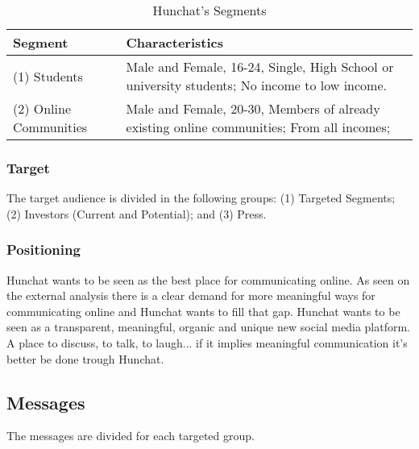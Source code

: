 \documentclass[12pt]{article}
\begin{document}
\begin{table}[htb]
\small
\caption{Hunchat's Segments}
\label{table:seg}
\centering
\begin{tabular}{ @{}P{0.2\textwidth}P{0.7\textwidth}@{} }
Segment	&	Characteristics	\\ \hline
(1) Students	&	Male and Female, 16-24, Single, High School or university students; No income to low income. \\
(2) Online Communities	& Male and Female, 20-30, Members of already existing online communities; From all incomes;
 \\ \hline
\end{tabular}
\end{table}

\subsubsection{Target}
The target audience is divided in the following groups: (1) Targeted Segments; (2) Investors (Current and Potential); and (3) Press.

\subsubsection{Positioning}
Hunchat wants to be seen as the best place for communicating online. As seen on the external analysis there is a clear demand for more meaningful ways for communicating online and Hunchat wants to fill that gap. Hunchat wants to be seen as a transparent, meaningful, organic and unique new social media platform. A place to discuss, to talk, to laugh... if it implies meaningful communication it's better be done trough Hunchat.


\subsection{Messages}
The messages are divided for each targeted group.
\end{document}
